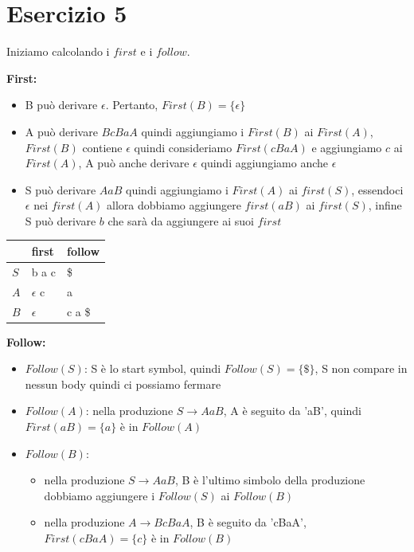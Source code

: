 \documentclass[11pt]{article}
\begin{document}
\section*{Esercizio 5}
Iniziamo calcolando i $first$ e i $follow$.
\begin{multicols}{2}
\noindent\textbf{First:}
\begin{itemize}
  \item B può derivare $\epsilon$. Pertanto, $First(B) = \{\epsilon\}$
  \item A può derivare $BcBaA$ quindi aggiungiamo i $First(B)$ ai $First(A)$, $First(B)$ contiene $\epsilon$
  quindi consideriamo $First(cBaA)$ e aggiungiamo $c$ ai $First(A)$,
  A può anche derivare $\epsilon$ quindi aggiungiamo anche $\epsilon$
  \item S può derivare $AaB$ quindi aggiungiamo i $First(A)$ ai $first(S)$,
  essendoci $\epsilon$ nei $first(A)$ allora dobbiamo aggiungere $first(aB)$ ai $first(S)$, infine S può derivare $b$ che sarà da aggiungere ai suoi $first$ 
\end{itemize}
\begin{table}[H]  
  \centering
  \begin{tabularx}{\linewidth}{|>{\centering\arraybackslash}X|>{\centering\arraybackslash}X|>{\centering\arraybackslash}X|}
    \hline
    & first & follow  \\
    \hline
    $S$ & b a c & \$ \\
    \hline
    $A$ & $\epsilon$ c & a \\
    \hline
    $B$ & $\epsilon$ & c a \$ \\
    \hline
  \end{tabularx}
  \label{tab:05-first-follow}
\end{table}
\textbf{Follow:} 
\begin{itemize}
  \item $Follow(S)$: S è lo start symbol, quindi $Follow(S) = \{\$\}$, S non compare in nessun body quindi ci possiamo fermare
  \item $Follow(A)$: nella produzione $S \to AaB$, A è seguito da 'aB', quindi $First(aB) = \{a\}$ è in $Follow(A)$
  \item $Follow(B)$:
  \begin{itemize}
    \item nella produzione $S \to AaB$, B è l'ultimo simbolo della produzione dobbiamo aggiungere i $Follow(S)$ ai $Follow(B)$
    \item nella produzione $A \to BcBaA$, B è seguito da 'cBaA', $First(cBaA) = \{c\}$ è in $Follow(B)$
  \end{itemize} 
\end{itemize}
\end{multicols}
\end{document}
